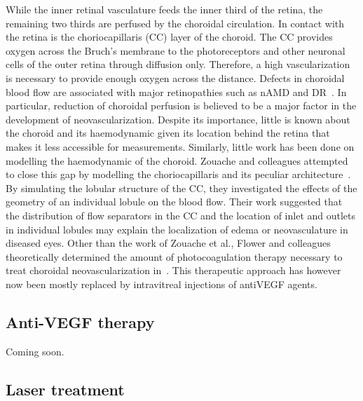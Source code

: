 \documentclass[12pt,a4paper]{article}
\begin{document}
While the inner retinal vasculature feeds the inner third of the retina, the remaining two thirds are perfused by the choroidal circulation.
In contact with the retina is the choriocapillaris (CC) layer of the choroid.
The CC provides oxygen across the Bruch's membrane to the photoreceptors and other neuronal cells of the outer retina through diffusion only.
Therefore, a high vascularization is necessary to provide enough oxygen across the distance.
Defects in choroidal blood flow are associated with major retinopathies such as nAMD and DR~\cite{Pemp_2008}.
In particular, reduction of choroidal perfusion is believed to be a major factor in the development of neovascularization.
Despite its importance, little is known about the choroid and its haemodynamic given its location behind the retina that makes it less accessible for measurements. 
Similarly, little work has been done on modelling the haemodynamic of the choroid.
Zouache and colleagues attempted to close this gap by modelling the choriocapillaris and its peculiar architecture~\cite{Zouache_2015}.
By simulating the lobular structure of the CC, they investigated the effects of the geometry of an individual lobule on the blood flow.
Their work suggested that the distribution of flow separators in the CC and the location of inlet and outlets in individual lobules may explain the localization of edema or neovasculature in diseased eyes.
Other than the work of Zouache et al., Flower and colleagues theoretically determined the amount of photocoagulation therapy necessary to treat choroidal neovascularization in~\cite{Flower_2001}.
This therapeutic approach has however now been mostly replaced by intravitreal injections of antiVEGF agents.


\subsection{Anti-VEGF therapy}
Coming soon.
\subsection{Laser treatment}

{\normalsize }
\end{document}
